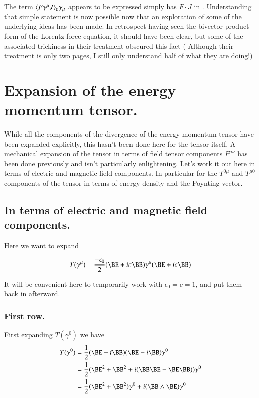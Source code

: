 The term ${\left\langle{{ F \gamma^\mu J }}\right\rangle}_{0} \gamma_\mu $ appears to be expressed simply has $F \cdot J$ in
\citep{doran2003gap}.  Understanding that simple statement is now possible now that an exploration
of some of the underlying ideas has been made.  In retrospect having seen the bivector product form of the Lorentz force equation, it should have been 
clear, but some of the associated trickiness in their treatment obscured this
fact ( Although their treatment is only two pages, I still only 
understand half of what they are doing!)


\section{Expansion of the energy momentum tensor. }

While all the components of the divergence of the energy momentum tensor have been expanded explicitly, this hasn't been
done here for the tensor itself.  A mechanical expansion of the tensor in terms of field tensor components $F^{\mu\nu}$ has been 
done previously and isn't particularly enlightening.  Let's work it out here in terms of electric and magnetic field components.  In particular for the $T^{0\mu}$ and $T^{\mu0}$ components of the tensor in terms of energy density and the Poynting vector.

\subsection{In terms of electric and magnetic field components. }

Here we want to expand 

\begin{align*}
T(\gamma^\mu) = \frac{-\epsilon_0}{2} (\BE + i c \BB) \gamma^\mu (\BE + i c \BB)
\end{align*}

It will be convenient here to temporarily work with $\epsilon_0 = c = 1$, and put them back in afterward.

\subsubsection{First row. } 

First expanding $T(\gamma^0)$ we have
\begin{align*}
T(\gamma^0) 
&= \frac{1}{2} (\BE + i \BB) (\BE - i \BB) \gamma^0 \\
&= \frac{1}{2} (\BE^2 + \BB^2 + i (\BB \BE - \BE \BB)) \gamma^0 \\
&= \frac{1}{2} (\BE^2 + \BB^2) \gamma^0 + i ( \BB \wedge \BE ) \gamma^0 \\
\end{align*}

